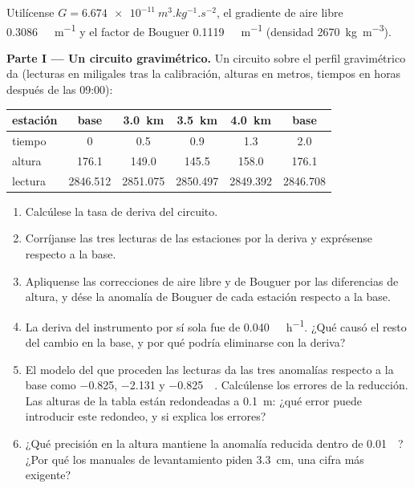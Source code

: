 \begin{problem}
\label{pb:b3:field-lab-methods-3:1}
Utilícense $G = \qty{6.674e-11}{m^3.kg^{-1}.s^{-2}}$, el gradiente de aire libre
\qty{0.3086}{\milli\gal.m^{-1}} y el factor de Bouguer
\qty{0.1119}{\milli\gal.m^{-1}} (densidad \qty{2670}{kg.m^{-3}}).

\medskip\noindent\textbf{Parte I --- Un circuito gravimétrico.} Un circuito sobre el
perfil gravimétrico da (lecturas en miligales tras la calibración, alturas
en metros, tiempos en horas después de las 09:00):
\begin{center}
\small
\begin{tabular}{lccccc}
\hline
estación & base & \qty{3.0}{km} & \qty{3.5}{km} & \qty{4.0}{km} & base \\
\hline
tiempo & 0 & 0.5 & 0.9 & 1.3 & 2.0 \\
altura & 176.1 & 149.0 & 145.5 & 158.0 & 176.1 \\
lectura & 2846.512 & 2851.075 & 2850.497 & 2849.392 & 2846.708 \\
\hline
\end{tabular}
\end{center}
\begin{enumerate}
\item Calcúlese la tasa de deriva del circuito.
\item Corríjanse las tres lecturas de las estaciones por la deriva y exprésense
  respecto a la base.
\item Apliquense las correcciones de aire libre y de Bouguer por las
  diferencias de altura, y dése la anomalía de Bouguer de cada estación respecto a
  la base.
\item La deriva del instrumento por sí sola fue de \qty{0.040}{\milli\gal.h^{-1}}.
  ¿Qué causó el resto del cambio en la base, y por qué podría eliminarse con la
  deriva?
\item El modelo del que proceden las lecturas da las tres anomalías
  respecto a la base como \num{-0.825}, \num{-2.131} y
  \qty{-0.825}{\milli\gal}. Calcúlense los errores de la reducción. Las
  alturas de la tabla están redondeadas a \qty{0.1}{m}: ¿qué error puede introducir
  este redondeo, y si explica los errores?
\item ¿Qué precisión en la altura mantiene la anomalía reducida dentro de
  \qty{0.01}{\milli\gal}? ¿Por qué los manuales de levantamiento piden
  \qty{3.3}{cm}, una cifra más exigente?
\end{enumerate}


\end{problem}
